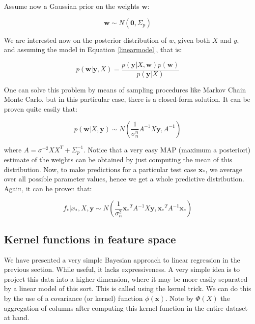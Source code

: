 \documentclass[10pt,a4paper,twoside]{book}
\begin{document}
Assume now a Gaussian prior on the weights $\boldsymbol{w}$:

\begin{equation}
\label{wprior}
\boldsymbol{w} \sim N(\boldsymbol{0}, \Sigma_p)
\end{equation}

We are interested now on the posterior distribution of $w$, given both $X$ and $y$, and assuming the model in Equation \ref{linearmodel}, that is:

\begin{equation}
p(\boldsymbol{w}|\boldsymbol{y}, X) = \dfrac{p(\boldsymbol{y}|X, \boldsymbol{w}) p(\boldsymbol{w})}{p(\boldsymbol{y}| X)}
\end{equation}

One can solve this problem by means of sampling procedures like Markov Chain Monte Carlo, but in this particular case, there is a closed-form solution. It can be proven quite easily that:

\begin{equation}
p(\boldsymbol{w}|X, \boldsymbol{y}) \sim N \left(\dfrac{1}{\sigma_n^n}A^{-1}X\boldsymbol{y}, A^{-1}\right)
\end{equation}

where $A = \sigma^{-2}XX^T + \Sigma_p^{-1}$. Notice that a very easy MAP (maximum a posteriori) estimate of the weights can be obtained by just computing the mean of this distribution. Now, to make predictions for a particular test case $\boldsymbol{x_{*}}$, we average over all possible parameter values, hence we get a whole predictive distribution. Again, it can be proven that:

\begin{equation}
f_{*}|x_{*}, X, \boldsymbol{y} \sim N\left(\dfrac{1}{\sigma_n^2}\boldsymbol{x_{*}}^T A^{-1}X\boldsymbol{y}, \boldsymbol{x_*}^T A^{-1} \boldsymbol{x}_{*}\right)
\end{equation} 

\subsection{Kernel functions in feature space}

We have presented a very simple Bayesian approach to linear regression in the previous section. While useful, it lacks expressiveness. A very simple idea is to project this data into a higher dimension, where it may be more easily separated by a linear model of this sort. This is called using the kernel trick. We can do this by the use of a covariance (or kernel) function $\phi(\boldsymbol{x})$. Note by $\Phi(X)$ the aggregation of columns after computing this kernel function in the entire dataset at hand.\\
\end{document}
